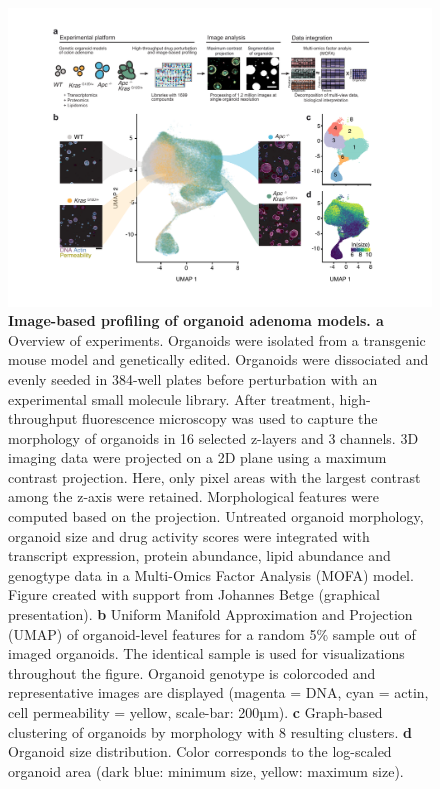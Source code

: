 \begin{flushleft}
\begin{figure}[h]
\centering
\includegraphics[width=\textwidth,
                height=\textheight,
                keepaspectratio]{figures/adenomaprofiling/pdf/fig_1_2.pdf}
\caption{\textbf{Image-based profiling of organoid adenoma models. a} Overview of experiments. Organoids were isolated from a transgenic mouse model and genetically edited. Organoids were dissociated and evenly seeded in 384-well plates before perturbation with an experimental small molecule library. After treatment, high-throughput fluorescence microscopy was used to capture the morphology of organoids in 16 selected z-layers and 3 channels. 3D imaging data were projected on a 2D plane using a maximum contrast projection. Here, only pixel areas with the largest contrast among the z-axis were retained. Morphological features were computed based on the projection. Untreated organoid morphology, organoid size and drug activity scores were integrated with transcript expression, protein abundance, lipid abundance and genogtype data in a Multi-Omics Factor Analysis (MOFA) model. Figure created with support from Johannes Betge (graphical presentation). 
\textbf{b} Uniform Manifold Approximation and Projection (UMAP) of organoid-level features for a random 5\% sample out of imaged organoids. The identical sample is used for visualizations throughout the figure. Organoid genotype is colorcoded and representative images are displayed (magenta = DNA, cyan = actin, cell permeability = yellow, scale-bar: 200µm). \textbf{c} Graph-based clustering of organoids by morphology with 8 resulting clusters. \textbf{d} Organoid size distribution. Color corresponds to the log-scaled organoid area (dark blue: minimum size, yellow: maximum size).}
\label{fig_120}
\end{figure}
\bigbreak


\end{flushleft}
